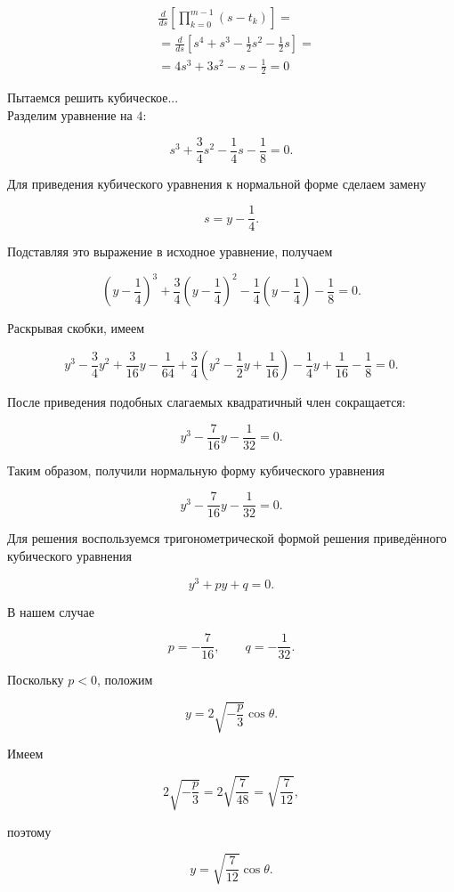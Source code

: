 \documentclass[12pt,a4paper]{article}
\begin{document}
	\begin{align*}
	&\frac{d}{ds} \left[\prod_{k=0}^{m-1} \left( s - t_{k} \right) \right] = \\ 
	&= \frac{d}{ds} \left[ s^4 + s^3 - \frac{1}{2}s^2 - \frac{1}{2}s \right] = \\
	&= 4s^3 + 3s^2 - s - \frac{1}{2} = 0
	\end{align*}
	
	\newpage
	
	\noindent Пытаемся решить кубическое...\\

	Разделим уравнение на $4$:
	
	$$
	s^3+\frac34s^2-\frac14s-\frac18=0.
	$$
	
	Для приведения кубического уравнения к нормальной форме сделаем замену
	
	$$
	s=y-\frac14.
	$$
	
	Подставляя это выражение в исходное уравнение, получаем
	
	$$
	\left(y-\frac14\right)^3
	+\frac34\left(y-\frac14\right)^2
	-\frac14\left(y-\frac14\right)
	-\frac18=0.
	$$
	
	Раскрывая скобки, имеем
	
	$$
	y^3-\frac34y^2+\frac3{16}y-\frac1{64}
	+\frac34\left(y^2-\frac12y+\frac1{16}\right)
	-\frac14y+\frac1{16}
	-\frac18=0.
	$$
	
	После приведения подобных слагаемых квадратичный член сокращается:
	
	$$
	y^3-\frac7{16}y-\frac1{32}=0.
	$$
	
	Таким образом, получили нормальную форму кубического уравнения
	
	$$
	\boxed{
		y^3-\frac7{16}y-\frac1{32}=0.
	}
	$$
	
	Для решения воспользуемся тригонометрической формой решения приведённого кубического уравнения
	
	$$
	y^3+py+q=0.
	$$
	
	В нашем случае
	
	$$
	p=-\frac7{16},
	\qquad
	q=-\frac1{32}.
	$$
	
	Поскольку $p<0$, положим
	
	$$
	y=2\sqrt{-\frac p3}\cos\theta.
	$$
	
	Имеем
	
	$$
	2\sqrt{-\frac p3}
	=
	2\sqrt{\frac7{48}}
	=
	\sqrt{\frac7{12}},
	$$
	
	поэтому
	
	$$
	y=\sqrt{\frac7{12}}\cos\theta.
	$$
	
\end{document}
